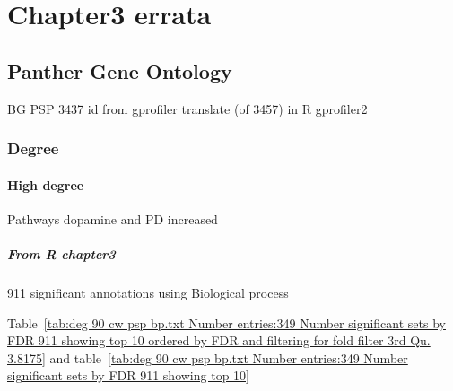 \chapter{Chapter3 errata}
\section{Panther Gene Ontology}
BG PSP 3437 id from gprofiler translate (of 3457) in R gprofiler2



\subsection{Degree}
\subsubsection{High degree}
Pathways dopamine and PD increased


\paragraph{From R chapter3}
911 significant annotations using Biological process

Table~\ref{tab:deg 90 cw psp bp.txt Number entries:349 Number significant sets by FDR 911 showing top 10 ordered by FDR and filtering for fold filter 3rd Qu. 3.8175} and table~\ref{tab:deg 90 cw psp bp.txt Number entries:349 Number significant sets by FDR 911 showing top 10}


